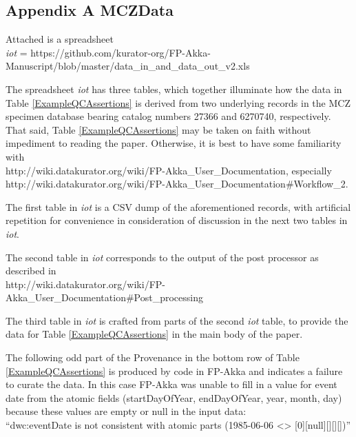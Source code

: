 \begin{appendices}
\large
\section{Appendix A MCZData} \label{appendix1}
\normalsize
Attached is a spreadsheet
\\\textit{iot} = https://github.com/kurator-org/FP-Akka-Manuscript/blob/master/data\_in\_and\_data\_out\_v2.xls 


The spreadsheet \textit{iot} has three tables, which together illuminate how the data 
in Table \ref{ExampleQCAssertions} is derived from two underlying records in the MCZ specimen database bearing catalog numbers 27366 and 6270740, respectively. That said, Table \ref{ExampleQCAssertions} may be taken on faith without impediment to reading the paper. Otherwise, it is best to have some familiarity with 
\\http://wiki.datakurator.org/wiki/FP-Akka\_User\_Documentation, especially 
\\http://wiki.datakurator.org/wiki/FP-Akka\_User\_Documentation\#Workflow\_2.

The first table in \textit{iot} is a CSV dump of the aforementioned records, with artificial repetition for convenience in consideration of discussion in the next two tables in \textit{iot}.

The second table in \textit{iot} corresponds to the output of the post processor as described in
\\http://wiki.datakurator.org/wiki/FP-Akka\_User\_Documentation\#Post\_processing

The third table in \textit{iot} is crafted from parts of the second  \textit{iot} table, 
to provide the data for Table 
\ref{ExampleQCAssertions} in the main body of the paper.

The following odd part of the Provenance in the bottom row of Table \ref{ExampleQCAssertions}  is produced by code in FP-Akka and indicates a failure to curate the data. In this case FP-Akka was unable to fill in a value for event date from the atomic fields (startDayOfYear, endDayOfYear, year, month, day) because these values are empty or null in the input data:\\
\hspace{1in}``dwc:eventDate is not consistent with atomic parts (1985-06-06 <> [0][null][][][])''


\end{appendices}
